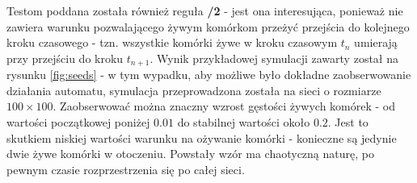 \documentclass[12pt] {article}
\begin{document}
Testom poddana została również reguła \textbf{/2} - jest ona interesująca, ponieważ nie zawiera warunku pozwalającego żywym komórkom przeżyć przejścia do kolejnego kroku czasowego - tzn. wszystkie komórki żywe w kroku czasowym $t_n$ umierają przy przejściu do kroku $t_{n+1}$. Wynik przykładowej symulacji zawarty został na rysunku \ref{fig:seeds} - w tym wypadku, aby możliwe było dokładne zaobserwowanie działania automatu, symulacja przeprowadzona została na sieci o rozmiarze $100\times100$. Zaobserwować można znaczny wzrost gęstości żywych komórek - od wartości początkowej poniżej $0.01$ do stabilnej wartości około $0.2$. Jest to skutkiem niskiej wartości warunku na ożywanie komórki - konieczne są jedynie dwie żywe komórki w otoczeniu. Powstały wzór ma chaotyczną naturę, po pewnym czasie rozprzestrzenia się po całej sieci. 
\end{document}
